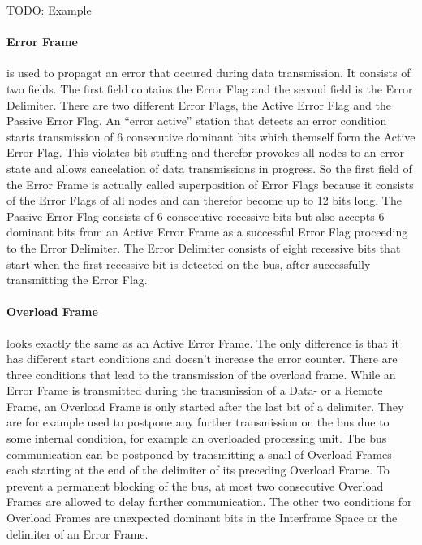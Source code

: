 	TODO: Example
	
	\paragraph{Error Frame} is used to propagat an error that occured during data
	transmission. It consists of two fields. The first field contains the Error
	Flag and the second field is the Error Delimiter. 
	There are two different Error Flags, the Active Error Flag and the Passive
	Error Flag. An ``error active'' station that detects an error condition starts
	transmission of 6 consecutive dominant bits which themself form the Active
	Error Flag. This violates bit stuffing and therefor provokes all nodes to an
	error state and allows cancelation of data transmissions in progress. So the
	first field of the Error Frame is actually called superposition of Error Flags
	because it consists of the Error Flags of all nodes and can therefor become up
	to 12 bits long.
	The Passive Error Flag consists of 6 consecutive recessive bits but also
	accepts 6 dominant bits from an Active Error Frame as a successful Error Flag
	proceeding to the Error Delimiter.
	The Error Delimiter consists of eight recessive bits that start when the
	first recessive bit is detected on the bus, after successfully transmitting the
	Error Flag.
	
    
    \paragraph{Overload Frame} looks exactly the same as an Active Error Frame.
    The only difference is that it has different start conditions and doesn't
    increase the error counter. There are three conditions that lead to the transmission of the
    overload frame. While an Error Frame is transmitted during the
    transmission of a Data- or a Remote Frame, an Overload Frame is only
    started after the last bit of a delimiter. They are for example used to postpone any
    further transmission on the bus due to some internal condition, for example
    an overloaded processing unit.
    The bus communication can be postponed by transmitting a snail of Overload Frames
    each starting at the end of the delimiter of its preceding Overload Frame.
    To prevent a permanent blocking of the bus, at most two consecutive Overload
    Frames are allowed to delay further communication. The other two conditions for
    Overload Frames are unexpected dominant bits in the Interframe Space or the delimiter of an Error Frame.
    
